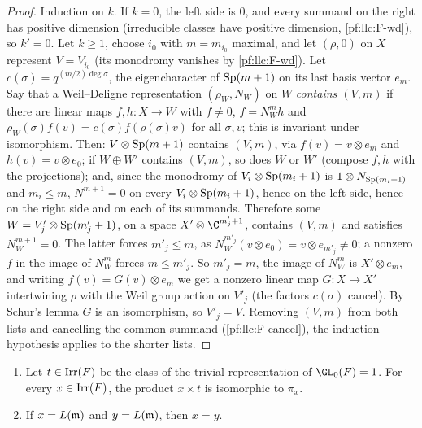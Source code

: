 \begin{proof}
Induction on $k$. If $k=0$, the left side is $0$, and every summand on the right has positive dimension (irreducible classes
have positive dimension, \ref{pf:llc:F-wd}), so $k'=0$. Let $k\ge1$, choose $i_0$ with $m=m_{i_0}$ maximal, and let $(\rho,0)$ on
$X$ represent $V=V_{i_0}$ (its monodromy vanishes by \ref{pf:llc:F-wd}). Let $c(\sigma)=q^{(m/2)\deg\sigma}$, the eigencharacter of
$\operatorname{Sp}(m+1)$ on its last basis vector $e_m$. Say that a Weil--Deligne representation $(\rho_W,N_W)$ on $W$ \emph{contains $(V,m)$}
if there are linear maps $f,h\colon X\to W$ with $f\ne0$, $f=N_W^mh$ and $\rho_W(\sigma)f(v)=c(\sigma)f(\rho(\sigma)v)$ for all $\sigma,v$;
this is invariant under isomorphism. Then: $V\otimes\operatorname{Sp}(m+1)$ contains $(V,m)$, via $f(v)=v\otimes e_m$ and $h(v)=v\otimes e_0$;
if $W\oplus W'$ contains $(V,m)$, so does $W$ or $W'$ (compose $f,h$ with the projections); and, since the monodromy of
$V_i\otimes\operatorname{Sp}(m_i+1)$ is $1\otimes N_{\operatorname{Sp}(m_i+1)}$ and $m_i\le m$, $N^{m+1}=0$ on every $V_i\otimes\operatorname{Sp}(m_i+1)$, hence on the
left side, hence on the right side and on each of its summands. Therefore some $W=V'_j\otimes\operatorname{Sp}(m'_j+1)$, on a space
$X'\otimes\C^{m'_j+1}$, contains $(V,m)$ and satisfies $N_W^{m+1}=0$. The latter forces $m'_j\le m$, as $N_W^{m'_j}(v\otimes e_0)=v\otimes e_{m'_j}\ne0$; a nonzero $f$ in the
image of $N_W^m$ forces $m\le m'_j$. So $m'_j=m$, the image of $N_W^m$ is $X'\otimes e_m$, and writing $f(v)=G(v)\otimes e_m$ we get a
nonzero linear map $G\colon X\to X'$ intertwining $\rho$ with the Weil group action on $V'_j$ (the factors $c(\sigma)$ cancel). By
Schur's lemma $G$ is an isomorphism, so $V'_j=V$. Removing $(V,m)$ from both lists and cancelling the common summand
(\ref{pf:llc:F-cancel}), the induction hypothesis applies to the shorter lists.
\end{proof}

\begin{lemma}\label{pf:llc:eqofisl}
\begin{enumerate}[label=(\alph*)]
\item Let $t\in\operatorname{Irr}(F)$ be the class of the trivial representation of $\GL_0(F)=1$. For every $x\in\operatorname{Irr}(F)$, the product
  $x\times t$ is isomorphic to $\pi_x$.
\item If $x=L(\mathfrak m)$ and $y=L(\mathfrak m)$, then $x=y$.
\end{enumerate}
\end{lemma}

